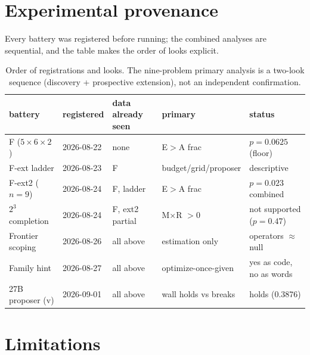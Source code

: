 \documentclass[11pt]{article}
\begin{document}
\section{Experimental provenance}
\label{sec:provenance}

Every battery was registered before running; the combined analyses are
sequential, and the table makes the order of looks explicit.

\begin{table}[h]
\centering\small
\begin{tabular}{@{}lllll@{}}
\toprule
battery & registered & data already seen & primary & status \\
\midrule
F ($5{\times}6{\times}2$) & 2026-08-22 & none & E$>$A frac & $p=0.0625$ (floor) \\
F-ext ladder & 2026-08-23 & F & budget/grid/proposer & descriptive \\
F-ext2 ($n{=}9$) & 2026-08-24 & F, ladder & E$>$A frac & $p=0.023$ combined \\
$2^3$ completion & 2026-08-24 & F, ext2 partial & M$\times$R $>0$ & not supported ($p=0.47$) \\
Frontier scoping & 2026-08-26 & all above & estimation only & operators $\approx$ null \\
Family hint & 2026-08-27 & all above & optimize-once-given & yes as code, no as words \\
27B proposer (v) & 2026-09-01 & all above & wall holds vs breaks & holds (0.3876) \\
\bottomrule
\end{tabular}
\caption{Order of registrations and looks. The nine-problem primary
analysis is a two-look sequence (discovery + prospective extension), not
an independent confirmation.}
\label{tab:provenance}
\end{table}

\section{Limitations}
\label{sec:limitations}
\end{document}
